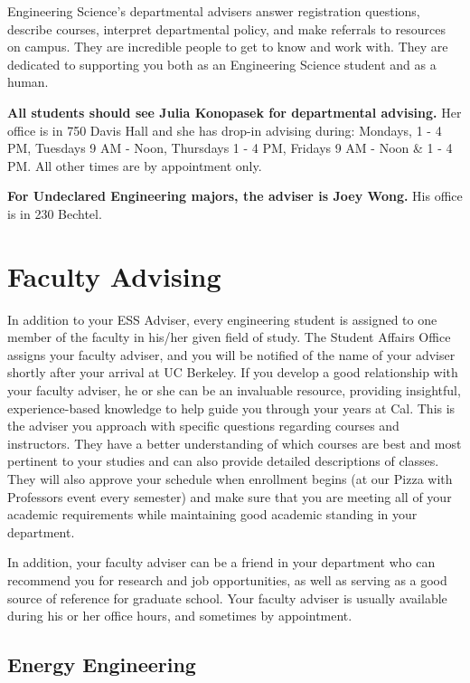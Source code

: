 Engineering Science’s departmental advisers answer registration questions, describe courses, interpret departmental policy, and make referrals to resources on campus. They are incredible people to get to know and work with. They are dedicated to supporting you both as an Engineering Science student and as a human.

\textbf{All students should see Julia Konopasek for departmental advising.} Her office is in 750 Davis Hall and she has drop-in advising during: Mondays, 1 - 4 PM, Tuesdays 9 AM - Noon, Thursdays 1 - 4 PM, Fridays 9 AM - Noon \& 1 - 4 PM. All other times are by appointment only.

\textbf{For Undeclared Engineering majors, the adviser is Joey Wong.} His office is in 230 Bechtel.

\section*{Faculty Advising}

In addition to your ESS Adviser, every engineering student is assigned to one member of the faculty in his/her given field of study. The Student Affairs Office assigns your faculty adviser, and you will be notified of the name of your adviser shortly after your arrival at UC Berkeley. If you develop a good relationship with your faculty adviser, he or she can be an invaluable resource, providing insightful, experience-based knowledge to help guide you through your years at Cal. This is the adviser you approach with specific questions regarding courses and instructors. They have a better understanding of which courses are best and most pertinent to your studies and can also provide detailed descriptions of classes. They will also approve your schedule when enrollment begins (at our Pizza with Professors event every semester) and make sure that you are meeting all of your academic requirements while maintaining good academic standing in your department.

In addition, your faculty adviser can be a friend in your department who can recommend you for research and job opportunities, as well as serving as a good source of reference for graduate school. Your faculty adviser is usually available during his or her office hours, and sometimes by appointment.

\subsection*{Energy Engineering}

